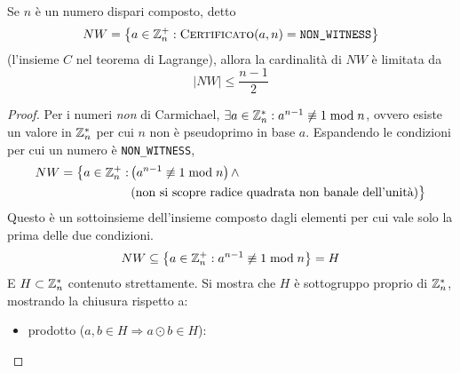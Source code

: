 \begin{theorem}
    \label{teo:cardinalita_certificati}
    Se $n$ è un numero dispari composto, detto 
    \begin{equation*}
        NW = \left\{ 
            a \in \zp{n} 
            :
            \Call{Certificato}{a, n} = 
            \text{\textnormal{\texttt{NON\_WITNESS}}}
        \right\}
    \end{equation*}
    (l'insieme $C$ nel teorema di Lagrange),
    allora la cardinalità di $NW$ è limitata da
    \begin{equation*}
        |NW| \leq
        \frac{n-1}{2}
    \end{equation*}
    \begin{proof}
        Per i numeri \emph{non} di Carmichael, $
        \exists a \in \mathbb{Z}_{n}^{*} : 
        a^{n-1} \not\equiv 1 \bmod n 
        $, ovvero esiste un valore in $\mathbb{Z}_{n}^{*} $ per cui $n$ non è pseudoprimo in base $a$.
        Espandendo le condizioni per cui un numero è
        \texttt{NON\_WITNESS},
        \begin{align*}
            NW = 
            \bigl\{ 
                a \in \mathbb{Z}_{n}^{+} 
                :
                &
                \left( 
                    a^{n-1} \not\equiv 1 \bmod n 
                \right)
                \wedge
                \\
                &
                \left( 
                    \text{non si scopre radice quadrata non banale dell'unità}
                \right)
            \bigr\} 
        \end{align*}
        Questo è un sottoinsieme dell'insieme composto dagli elementi per cui vale solo la prima delle due condizioni.
        \begin{equation*}
            NW \subseteq 
            \left\{ 
                a \in \mathbb{Z}_{n}^{+} 
                :
                a^{n-1} \not\equiv 1 \bmod n 
            \right\}
            = H
        \end{equation*}
        E $
        H \subset \mathbb{Z}_{n}^{*} 
        $ contenuto strettamente.
        Si mostra che $H$ è sottogruppo proprio di $\mathbb{Z}_{n}^{*} $, mostrando la chiusura rispetto a:
        \begin{itemize}
            \item prodotto
                ($
                    a,b \in H \Rightarrow a \odot b \in H
                $):
                \begin{equation*}

\end{equation*}
\end{itemize}
\end{proof}
\end{theorem}
